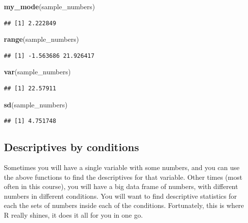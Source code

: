 \documentclass[
]{book}
\newenvironment{Shaded}{\begin{snugshade}}{\end{snugshade}}
\newcommand{\FunctionTok}[1]{\textcolor[rgb]{0.13,0.29,0.53}{\textbf{#1}}}
\newcommand{\NormalTok}[1]{#1}
\begin{document}
\begin{Shaded}
\begin{Highlighting}[]
\FunctionTok{my\_mode}\NormalTok{(sample\_numbers)}
\end{Highlighting}
\end{Shaded}

\begin{verbatim}
## [1] 2.222849
\end{verbatim}

\begin{Shaded}
\begin{Highlighting}[]
\FunctionTok{range}\NormalTok{(sample\_numbers)}
\end{Highlighting}
\end{Shaded}

\begin{verbatim}
## [1] -1.563686 21.926417
\end{verbatim}

\begin{Shaded}
\begin{Highlighting}[]
\FunctionTok{var}\NormalTok{(sample\_numbers)}
\end{Highlighting}
\end{Shaded}

\begin{verbatim}
## [1] 22.57911
\end{verbatim}

\begin{Shaded}
\begin{Highlighting}[]
\FunctionTok{sd}\NormalTok{(sample\_numbers)}
\end{Highlighting}
\end{Shaded}

\begin{verbatim}
## [1] 4.751748
\end{verbatim}

\hypertarget{descriptives-by-conditions}{%
\subsection{Descriptives by conditions}\label{descriptives-by-conditions}}

Sometimes you will have a single variable with some numbers, and you can use the above functions to find the descriptives for that variable. Other times (most often in this course), you will have a big data frame of numbers, with different numbers in different conditions. You will want to find descriptive statistics for each the sets of numbers inside each of the conditions. Fortunately, this is where R really shines, it does it all for you in one go.
\end{document}
